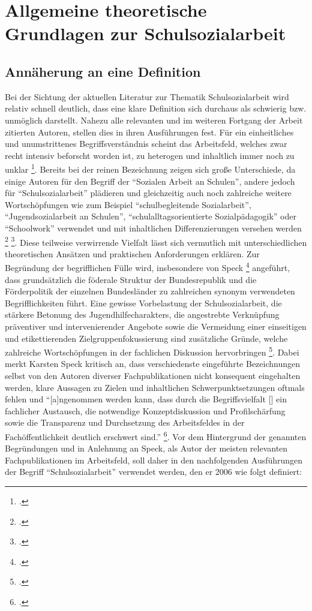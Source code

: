 \section{Allgemeine theoretische Grundlagen zur Schulsozialarbeit}
\label{sec:AllgemeineTheoretischeGrundlagenZurSchulsozialarbeit}

\subsection{Annäherung an eine Definition}
\label{sec:AnnäherungAnEineDefinition}

Bei der Sichtung der aktuellen Literatur zur Thematik Schulsozialarbeit wird relativ schnell deutlich, dass eine klare Definition sich durchaus als schwierig bzw. unmöglich darstellt. Nahezu alle relevanten und im weiteren Fortgang der Arbeit zitierten Autoren, stellen dies in ihren Ausführungen fest. Für ein einheitliches und unumstrittenes Begriffsverständnis scheint das Arbeitsfeld, welches zwar recht intensiv beforscht worden ist, zu heterogen und inhaltlich immer noch zu unklar \footcite[vgl.][7]{Speck2010}. Bereits bei der reinen Bezeichnung zeigen sich große Unterschiede, da einige Autoren für den Begriff der "`Sozialen Arbeit an Schulen"', andere jedoch für "`Schulsozialarbeit"' plädieren und gleichzeitig auch noch zahlreiche weitere Wortschöpfungen wie zum Beispiel "`schulbegleitende Sozialarbeit"', "`Jugendsozialarbeit an Schulen"', "`schulalltagsorientierte Sozialpädagogik"' oder "`Schoolwork"' verwendet und mit inhaltlichen Differenzierungen versehen werden \footcite [vgl.][14]{Spies2011} \footcite[vgl.][17f]{Stuewe2015}. Diese teilweise verwirrende Vielfalt lässt sich vermutlich mit unterschiedlichen theoretischen Ansätzen und praktischen Anforderungen erklären. Zur Begründung der begrifflichen Fülle wird, insbesondere von Speck \footcite[vgl.][23]{Speck2007} angeführt, dass grundsätzlich die föderale Struktur der Bundesrepublik und die Förderpolitik der einzelnen Bundesländer zu zahlreichen synonym verwendeten Begrifflichkeiten führt. Eine gewisse Vorbelastung der Schulsozialarbeit, die stärkere Betonung des Jugendhilfecharakters, die angestrebte Verknüpfung präventiver und intervenierender Angebote sowie die Vermeidung einer einseitigen und etikettierenden Zielgruppenfokussierung sind zusätzliche Gründe, welche zahlreiche Wortschöpfungen in der fachlichen Diskussion hervorbringen \footcite[vgl.][23]{Speck2007}. Dabei merkt Karsten Speck kritisch an, dass verschiedenste eingeführte Bezeichnungen selbst von den Autoren diverser Fachpublikationen nicht konsequent eingehalten werden, klare Aussagen zu Zielen und inhaltlichen Schwerpunktsetzungen oftmals fehlen und "`[a]ngenommen werden kann, dass durch die Begriffsvielfalt [\punkte] ein fachlicher Austausch, die notwendige Konzeptdiskussion und Profilschärfung sowie die Transparenz und Durchsetzung des Arbeitsfeldes in der Fachöffentlichkeit deutlich erschwert sind."' \footcite[24]{Speck2007}. Vor dem Hintergrund der genannten Begründungen und in Anlehnung an Speck, als Autor der meisten relevanten Fachpublikationen im Arbeitsfeld, soll daher in den nachfolgenden Ausführungen der Begriff "`Schulsozialarbeit"' verwendet werden, den er 2006 wie folgt definiert:

